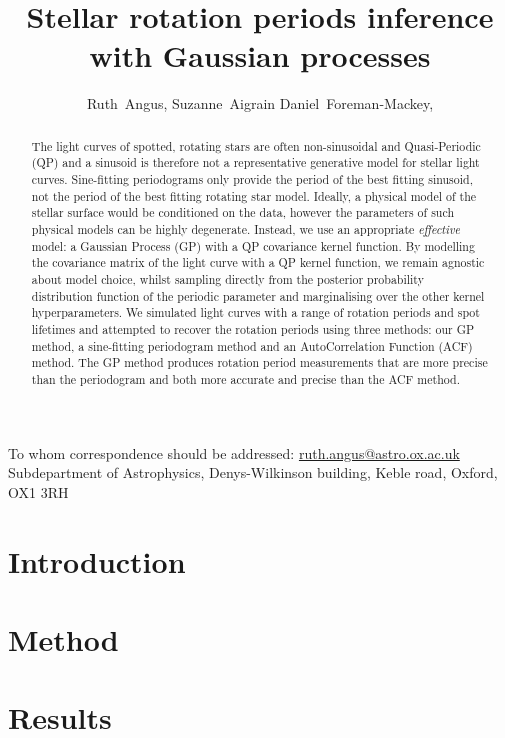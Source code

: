 \documentclass[11pt,preprint]{aastex}
\begin{document}
\title{%
	Stellar rotation periods inference with Gaussian processes
}

\newcommand{\oxford}{1}
\newcommand{\UW}{2}
\author{%
    Ruth~Angus\altaffilmark{1,\oxford},
    Suzanne~Aigrain\altaffilmark{\oxford}
    Daniel~Foreman-Mackey\altaffilmark{\UW},
}
         {To whom correspondence should be addressed:
                          \url{ruth.angus@astro.ox.ac.uk}}
\altaffiltext{\oxford}      {Subdepartment of Astrophysics, Denys-Wilkinson
	building, Keble road, Oxford, OX1 3RH}

\begin{abstract}

The light curves of spotted, rotating stars are often non-sinusoidal and
Quasi-Periodic (QP) and a sinusoid is therefore not a representative generative
model for stellar light curves.
Sine-fitting periodograms only provide the period of the best fitting
sinusoid, not the period of the best fitting rotating star model.
Ideally, a physical model of the stellar surface would be conditioned on the
data, however the parameters of such physical models can be highly degenerate.
Instead, we use an appropriate {\it effective} model: a Gaussian Process (GP)
with a QP covariance kernel function.
By modelling the covariance matrix of the light curve with a QP kernel
function, we remain agnostic about model choice, whilst sampling directly from
the posterior probability distribution function of the periodic parameter and
marginalising over the other kernel hyperparameters.
We simulated light curves with a range of rotation periods and spot lifetimes
and attempted to recover the rotation periods using three methods: our GP
method, a sine-fitting periodogram method and an AutoCorrelation Function (ACF)
method.
The GP method produces rotation period measurements that are more precise than
the periodogram and both more accurate and precise than the ACF method.

\end{abstract}

\section{Introduction}

\section{Method}

\section{Results}
\end{document}
